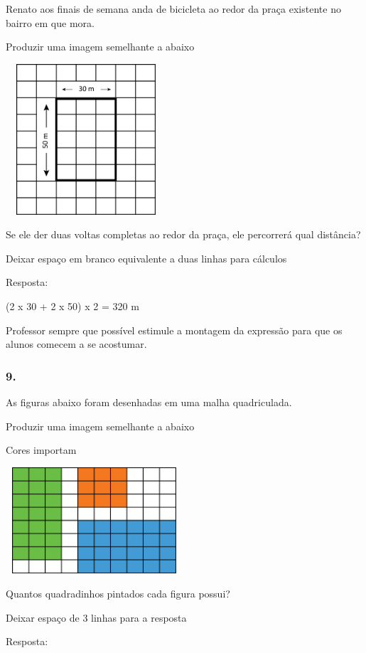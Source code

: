 Renato aos finais de semana anda de bicicleta ao redor da praça
existente no bairro em que mora.

Produzir uma imagem semelhante a abaixo

\includegraphics[width=2.35256in,height=2.20730in]{media/image55.png}

Se ele der duas voltas completas ao redor da praça, ele percorrerá qual
distância?

Deixar espaço em branco equivalente a duas linhas para cálculos

Resposta:

(2 x 30 + 2 x 50) x 2 = 320 m

Professor sempre que possível estimule a montagem da expressão para que
os alunos comecem a se acostumar.

\subsubsection{9.}\label{section-72}

As figuras abaixo foram desenhadas em uma malha quadriculada.

Produzir uma imagem semelhante a abaixo

Cores importam

\includegraphics[width=2.59189in,height=1.55847in]{media/image56.png}

Quantos quadradinhos pintados cada figura possui?

Deixar espaço de 3 linhas para a resposta

Resposta:


